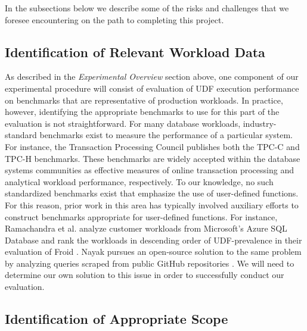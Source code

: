 \documentclass{vldb}
\begin{document}
In the subsections below we describe some of the risks and challenges that we foresee encountering on the path to completing this project.

\subsection{Identification of Relevant Workload Data}

As described in the \textit{Experimental Overview} section above, one component of our experimental procedure will consist of evaluation of UDF execution performance on benchmarks that are representative of production workloads. In practice, however, identifying the appropriate benchmarks to use for this part of the evaluation is not straightforward. For many database workloads, industry-standard benchmarks exist to measure the performance of a particular system. For instance, the Transaction Processing Council publishes both the TPC-C \cite{tpcc} and TPC-H \cite{tpch} benchmarks. These benchmarks are widely accepted within the database systems communities as effective measures of online transaction processing and analytical workload performance, respectively. To our knowledge, no such standardized benchmarks exist that emphasize the use of user-defined functions. For this reason, prior work in this area has typically involved auxiliary efforts to construct benchmarks appropriate for user-defined functions. For instance, Ramachandra et al. analyze customer workloads from Microsoft's Azure SQL Database \cite{azure} and rank the workloads in descending order of UDF-prevalence in their evaluation of Froid \cite{froid}. Nayak pursues an open-source solution to the same problem by analyzing queries scraped from public GitHub \cite{github} repositories \cite{tanuj}. We will need to determine our own solution to this issue in order to successfully conduct our evaluation. 

\subsection{Identification of Appropriate Scope}
\end{document}

